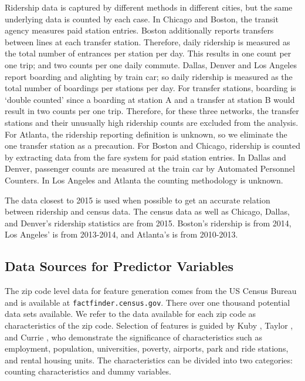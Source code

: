 \documentclass[11pt]{article}
\begin{document}
Ridership data is captured by different methods in different cities, but the same underlying data is counted by each case. In Chicago and Boston, the transit agency measures paid station entries. Boston additionally reports transfers between lines at each transfer station. Therefore, daily ridership is measured as the total number of entrances per station per day. This results in one count per one trip; and two counts per one daily commute. Dallas, Denver and Los Angeles report boarding and alighting by train car; so daily ridership is measured as the total number of boardings per stations per day. For transfer stations, boarding is `double counted' since a boarding at station A and a transfer at station B would result in two counts per one trip. Therefore, for these three networks, the transfer stations and their unusually high ridership counts are excluded from the analysis. For Atlanta, the ridership reporting definition is unknown, so we eliminate the one transfer station as a precaution. For Boston and Chicago, ridership is counted by extracting data from the fare system for paid station entries. In Dallas and Denver, passenger counts are measured at the train car by Automated Personnel Counters. In Los Angeles and Atlanta the counting methodology is unknown. 

The data closest to 2015 is used when possible to get an accurate relation between ridership and census data. The census data as well as Chicago, Dallas, and Denver's ridership statistics are from 2015. Boston's ridership is from 2014, Los Angeles' is from 2013-2014, and Atlanta's is from 2010-2013. 

\subsection{Data Sources for Predictor Variables}\label{sec:data}

The zip code level data for feature generation comes from the US Census Bureau and is available at \texttt{factfinder.census.gov}. There over one thousand potential data sets available. We refer to the data available for each zip code as characteristics of the zip code. Selection of features is guided by Kuby \cite{Kuby2004}, Taylor \cite{Taylor2008}, and Currie \cite{Currie2011}, who demonstrate the significance of characteristics such as employment, population, universities, poverty, airports, park and ride stations, and rental housing units. The characteristics can be divided into two categories: counting characteristics and dummy variables. 
\end{document}
